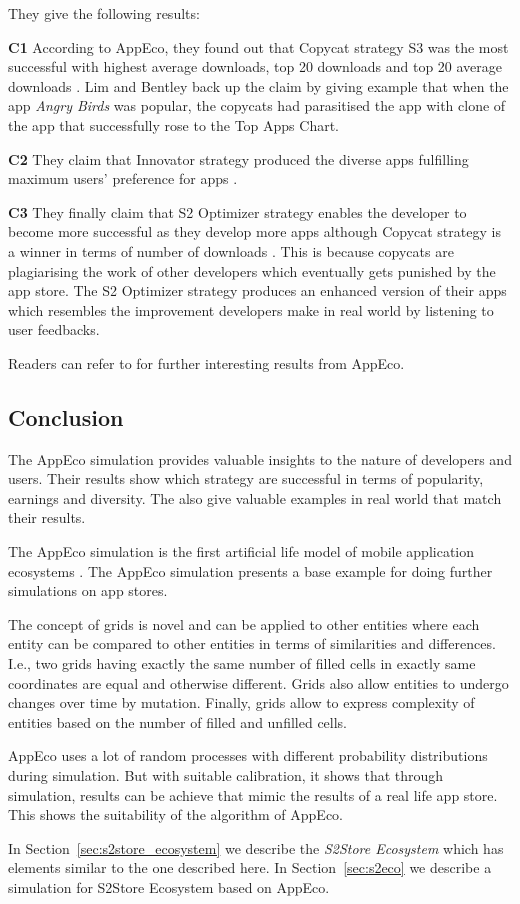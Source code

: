 They give the following results:

\textbf{C1} According to AppEco, they found out that Copycat strategy S3 was the most successful with highest average downloads, top 20 downloads and top 20 average downloads \cite{lim2012successful}. Lim and Bentley back up the claim by giving example that when the app \emph{Angry Birds} was popular, the copycats had parasitised the app with clone of the app that successfully rose to the Top Apps Chart.

\textbf{C2} They claim that Innovator strategy produced the diverse apps fulfilling maximum users' preference for apps \cite{lim2012successful}.

\textbf{C3} They finally claim that S2 Optimizer strategy enables the developer to become more successful as they develop more apps although Copycat strategy is a winner in terms of number of downloads \cite{lim2012successful}. This is because copycats are plagiarising the work of other developers which eventually gets punished by the app store. The S2 Optimizer strategy produces an enhanced version of their apps which resembles the improvement developers make in real world by listening to user feedbacks.

Readers can refer to \cite{lim2012successful} for further interesting results from AppEco.

\subsection{Conclusion}

The AppEco simulation provides valuable insights to the nature of developers and users. Their results show which strategy are successful in terms of popularity, earnings and diversity. The also give valuable examples in real world that match their results.

The AppEco simulation is the first artificial life model of mobile application ecosystems \cite{lim2012successful}. The AppEco simulation presents a base example for doing further simulations on app stores.

The concept of grids is novel and can be applied to other entities where each entity can be compared to other entities in terms of similarities and differences. I.e., two grids having exactly the same number of filled cells in exactly same coordinates are equal and otherwise different. Grids also allow entities to undergo changes over time by mutation. Finally, grids allow to express complexity of entities based on the number of filled and unfilled cells.

AppEco uses a lot of random processes with different probability distributions during simulation. But with suitable calibration, it shows that through simulation, results can be achieve that mimic the results of a real life app store. This shows the suitability of the algorithm of AppEco.

In Section~\ref{sec:s2store_ecosystem} we describe the \emph{S2Store Ecosystem} which has elements similar to the one described here. In Section~\ref{sec:s2eco} we describe a simulation for S2Store Ecosystem based on AppEco.

